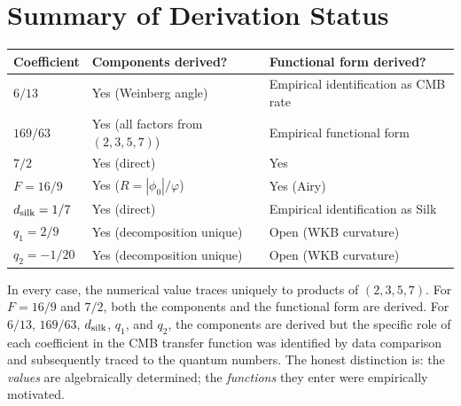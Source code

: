 \documentclass[11pt,letterpaper]{article}
\numberwithin{equation}{section}
\begin{document}
\section{Summary of Derivation Status}

\begin{center}
\begin{tabular}{lll}
\toprule
Coefficient & Components derived? & Functional form derived? \\
\midrule
$6/13$ & Yes (Weinberg angle) & Empirical identification as CMB rate \\
$169/63$ & Yes (all factors from $(2,3,5,7)$) & Empirical functional form \\
$7/2$ & Yes (direct) & Yes \\
$F = 16/9$ & Yes ($R = |\phi_0|/\varphi$) & Yes (Airy) \\
$d_{\rm silk} = 1/7$ & Yes (direct) & Empirical identification as Silk \\
$q_1 = 2/9$ & Yes (decomposition unique) & Open (WKB curvature) \\
$q_2 = -1/20$ & Yes (decomposition unique) & Open (WKB curvature) \\
\bottomrule
\end{tabular}
\end{center}

In every case, the numerical value traces uniquely to products of
$(2, 3, 5, 7)$.  For $F = 16/9$ and $7/2$, both the components and
the functional form are derived.  For $6/13$, $169/63$, $d_{\rm silk}$,
$q_1$, and $q_2$, the components are derived but the specific role
of each coefficient in the CMB transfer function was identified by
data comparison and subsequently traced to the quantum numbers.
The honest distinction is: the \emph{values} are algebraically
determined; the \emph{functions} they enter were empirically
motivated.
\end{document}
